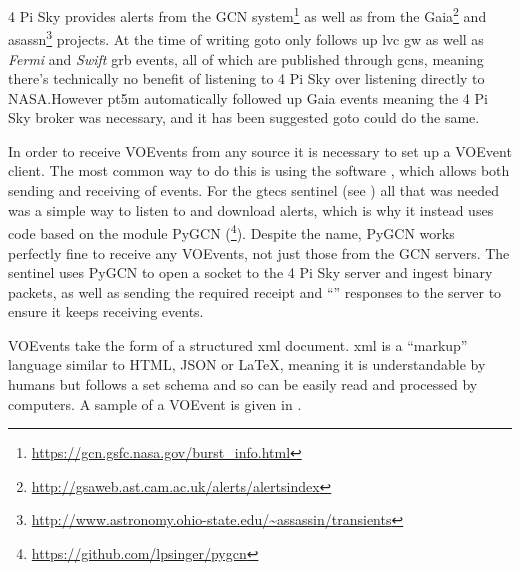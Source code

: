 \begin{colsection}
\begin{colsection}
4 Pi Sky provides alerts from the GCN system\footnote{\url{https://gcn.gsfc.nasa.gov/burst_info.html}} as well as from the Gaia\footnote{\url{http://gsaweb.ast.cam.ac.uk/alerts/alertsindex}} and \gls{asassn}\footnote{\url{http://www.astronomy.ohio-state.edu/~assassin/transients}} projects. At the time of writing \gls{goto} only follows up \gls{lvc} \gls{gw} as well as \textit{Fermi} and \textit{Swift} \gls{grb} events, all of which are published through \glspl{gcn}, meaning there's technically no benefit of listening to 4 Pi Sky over listening directly to NASA.\@ However pt5m automatically followed up Gaia events meaning the 4 Pi Sky broker was necessary, and it has been suggested \gls{goto} could do the same.

In order to receive VOEvents from any source it is necessary to set up a VOEvent client. The most common way to do this is using the  software \citep{comet}, which allows both sending and receiving of events. For the \gls{gtecs} sentinel (see ) all that was needed was a simple way to listen to and download alerts, which is why it instead uses code based on the  module PyGCN (\footnote{\url{https://github.com/lpsinger/pygcn}}). Despite the name, PyGCN works perfectly fine to receive any VOEvents, not just those from the GCN servers. The sentinel uses PyGCN to open a socket to the 4 Pi Sky server and ingest binary packets, as well as sending the required receipt and ``'' responses to the server to ensure it keeps receiving events.

VOEvents take the form of a structured \gls{xml} document. \gls{xml} is a ``markup'' language similar to HTML, JSON or \LaTeX, meaning it is understandable by humans but follows a set schema and so can be easily read and processed by computers. A sample of a VOEvent is given in .


\end{colsection}
\end{colsection}
